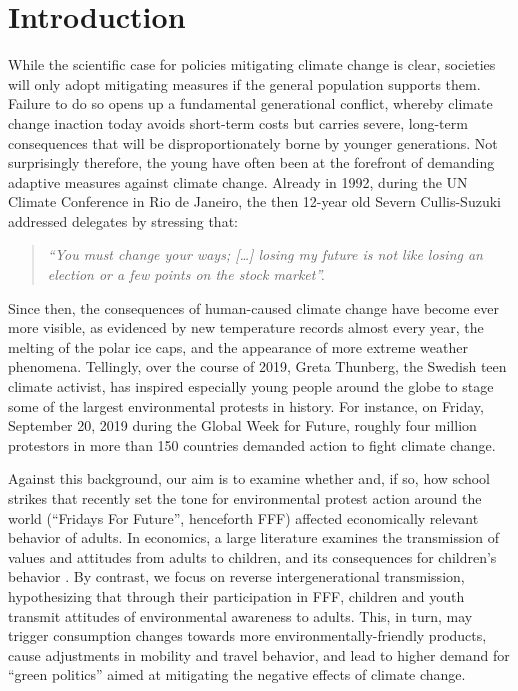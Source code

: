 
\bigskip
\section{Introduction}\label{sec_greta_cons:intro}

While the scientific case for policies mitigating climate change is clear, societies will only adopt mitigating measures if the general population supports them. Failure to do so opens up a fundamental generational conflict, whereby climate change inaction today avoids short-term costs but carries severe, long-term consequences that will be disproportionately borne by younger generations. Not surprisingly therefore, the young have often been at the forefront of demanding adaptive measures against climate change. Already in 1992, during the UN Climate Conference in Rio de Janeiro, the then 12-year old Severn Cullis-Suzuki addressed delegates by stressing that: 
\begin{quote}
	\textit{“You must change your ways; […] losing my future is not like losing an election or a few points on the stock market”.}
\end{quote}
Since then, the consequences of human-caused climate change have become ever more visible, as evidenced by new temperature records almost every year, the melting of the polar ice caps, and the appearance of more extreme weather phenomena.  Tellingly, over the course of 2019, Greta Thunberg, the Swedish teen climate activist, has inspired especially young people around the globe to stage some of the largest environmental protests in history. For instance, on Friday, September 20, 2019 during the Global Week for Future, roughly four million protestors in more than 150 countries demanded action to fight climate change. 


Against this background, our aim is to examine whether and, if so, how school strikes that recently set the tone for environmental protest action around the world (“Fridays For Future”, henceforth FFF) affected economically relevant behavior of adults. In economics, a large literature examines the transmission of values and attitudes from adults to children, and its consequences for children’s behavior \citep{bisin2001economics,figlio2019longterm}. By contrast, we focus on reverse intergenerational transmission, hypothesizing that through their participation in FFF, children and youth transmit attitudes of environmental awareness to adults. This, in turn, may trigger consumption changes towards more environmentally-friendly products, cause adjustments in mobility and travel behavior, and lead to higher demand for ``green politics'' aimed at mitigating the negative effects of climate change. 

